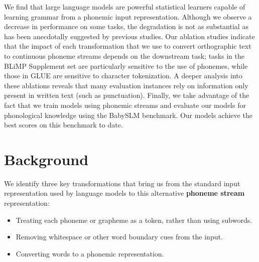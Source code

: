 We find that large language models are powerful statistical learners capable of learning grammar from a phonemic input representation. Although we observe a decrease in performance on some tasks, the degradation is not as substantial as has been anecdotally suggested by previous studies. Our ablation studies indicate that the impact of each transformation that we use to convert orthographic text to continuous phoneme streams depends on the downstream task; tasks in the BLiMP Supplement set are particularly sensitive to the use of phonemes, while those in GLUE are sensitive to character tokenization. A deeper analysis into these ablations reveals that many evaluation instances rely on information only present in written text (such as punctuation). Finally, we take advantage of the fact that we train models using phonemic streams and evaluate our models for phonological knowledge using the BabySLM benchmark. Our models achieve the best scores on this benchmark to date.%




\section{Background}

We identify three key transformations that bring us from the standard input representation used by language models to this alternative \textbf{phoneme stream} representation:

\begin{itemize}
\setlength\itemsep{0.1em}
    \item {} Treating each phoneme or grapheme as a token, rather than using subwords.
    \item {} Removing whitespace or other word boundary cues from the input.
    \item {} Converting words to a phonemic representation. 
\end{itemize}

